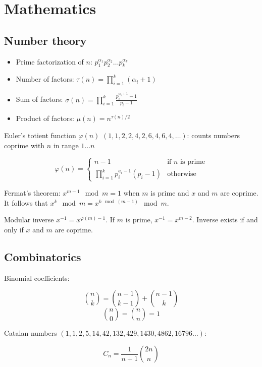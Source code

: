 \documentclass{article}
\begin{document}


\section {Mathematics}

\subsection {Number theory}

\begin{itemize}
	\item Prime factorization of $n$: $p_1^{\alpha_1}p_2^{\alpha_2} \dots p_k^{\alpha_k}$
	\item Number of factors: $\tau(n) = \prod_{i=1}^{k} (\alpha_i+1)$
	\item Sum of factors: $\sigma(n) = \prod_{i=1}^{k} \frac{p_i^{\alpha_i+1}-1}{p_i-1}$
	\item Product of factors: $\mu(n) = n^{\tau(n)/2}$
\end{itemize}

Euler's totient function $\varphi(n)$ $(1, 1, 2, 2, 4, 2, 6, 4, 6, 4, \dots)$: counts numbers coprime with $n$ in range $1 \dots n$

\[
	\varphi(n) =
	\begin{cases}
		n-1 &\text{if $n$ is prime} \\
		\prod_{i=1}^{k} p_i^{a_i-1}(p_i-1) &\text{otherwise}
	\end{cases}
\]

Fermat's theorem: $x^{m-1} \mod m = 1$ when $m$ is prime and $x$ and $m$ are coprime. It follows that $x^k \mod m = x^{k \mod (m-1)} \mod m$.

Modular inverse $x^{-1} = x^{\varphi(m)-1}$. If $m$ is prime, $x^{-1} = x^{m-2}$. Inverse exists if and only if $x$ and $m$ are coprime.

\subsection {Combinatorics}

Binomial coefficients:

\[ \binom{n}{k} = \binom{n-1}{k-1} + \binom{n-1}{k} \]
\[ \binom{n}{0} = \binom{n}{n} = 1 \]

Catalan numbers $(1, 1, 2, 5, 14, 42, 132, 429, 1430, 4862, 16796 \dots)$:

\[ C_n = \frac{1}{n+1} \binom{2n}{n} \]
\end{document}
